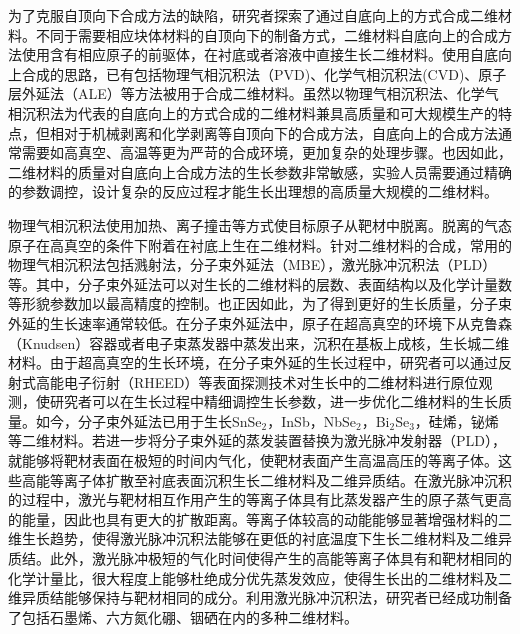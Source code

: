     为了克服自顶向下合成方法的缺陷，研究者探索了通过自底向上的方式合成二维材料。不同于需要相应块体材料的自顶向下的制备方式，二维材料自底向上的合成方法使用含有相应原子的前驱体，在衬底或者溶液中直接生长二维材料。使用自底向上合成的思路，已有包括物理气相沉积法（PVD)、化学气相沉积法(CVD)、原子层外延法（ALE）等方法被用于合成二维材料。虽然以物理气相沉积法、化学气相沉积法为代表的自底向上的方式合成的二维材料兼具高质量和可大规模生产的特点，但相对于机械剥离和化学剥离等自顶向下的合成方法，自底向上的合成方法通常需要如高真空、高温等更为严苛的合成环境，更加复杂的处理步骤。也因如此，二维材料的质量对自底向上合成方法的生长参数非常敏感，实验人员需要通过精确的参数调控，设计复杂的反应过程才能生长出理想的高质量大规模的二维材料。

    物理气相沉积法使用加热、离子撞击等方式使目标原子从靶材中脱离。脱离的气态原子在高真空的条件下附着在衬底上生在二维材料。针对二维材料的合成，常用的物理气相沉积法包括溅射法，分子束外延法（MBE），激光脉冲沉积法（PLD）等。其中，分子束外延法可以对生长的二维材料的层数、表面结构以及化学计量数等形貌参数加以最高精度的控制。也正因如此，为了得到更好的生长质量，分子束外延的生长速率通常较低。在分子束外延法中，原子在超高真空的环境下从克鲁森（Knudsen）容器或者电子束蒸发器中蒸发出来，沉积在基板上成核，生长城二维材料。由于超高真空的生长环境，在分子束外延的生长过程中，研究者可以通过反射式高能电子衍射（RHEED）等表面探测技术对生长中的二维材料进行原位观测，使研究者可以在生长过程中精细调控生长参数，进一步优化二维材料的生长质量。如今，分子束外延法已用于生长SnSe$_2$，InSb，NbSe$_2$，Bi$_2$Se$_3$，硅烯，铋烯等二维材料。若进一步将分子束外延的蒸发装置替换为激光脉冲发射器（PLD），就能够将靶材表面在极短的时间内气化，使靶材表面产生高温高压的等离子体。这些高能等离子体扩散至衬底表面沉积生长二维材料及二维异质结。在激光脉冲沉积的过程中，激光与靶材相互作用产生的等离子体具有比蒸发器产生的原子蒸气更高的能量，因此也具有更大的扩散距离。等离子体较高的动能能够显著增强材料的二维生长趋势，使得激光脉冲沉积法能够在更低的衬底温度下生长二维材料及二维异质结。此外，激光脉冲极短的气化时间使得产生的高能等离子体具有和靶材相同的化学计量比，很大程度上能够杜绝成分优先蒸发效应，使得生长出的二维材料及二维异质结能够保持与靶材相同的成分。利用激光脉冲沉积法，研究者已经成功制备了包括石墨烯、六方氮化硼、铟硒在内的多种二维材料。%

